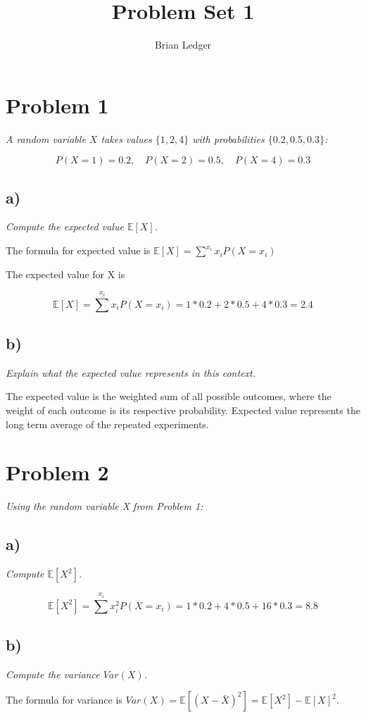 \documentclass[11pt, oneside]{article}   	%
\title{Problem Set 1}
\author{Brian Ledger}
\begin{document}
\maketitle
\section*{Problem 1}
\emph{A random variable $X$ takes values $\{1,2,4\}$ with probabilities $\{0.2,0.5,0.3\}$:}

$$
P(X=1) = 0.2, \quad P(X=2) = 0.5, \quad P(X = 4) = 0.3
$$
\subsection*{a)}
\emph{Compute the expected value $\mathbb{E}[X]$.}

The formula for expected value is $\mathbb{E}[X] = \sum^{x_i} x_iP(X=x_i)$

The expected value for X is

$$
\mathbb{E}[X] = \sum^{x_i} x_iP(X=x_i) = 1*0.2 + 2 * 0.5 + 4 * 0.3 = 2.4
$$

\subsection*{b)}
\emph{Explain what the expected value represents in this context.}

The expected value is the weighted sum of all possible outcomes, where the weight of each outcome is its respective probability. Expected value represents the long term average of the repeated experiments.

\section*{Problem 2}
\emph{Using the random variable X from Problem 1:}

\subsection*{a)}
\emph{Compute $\mathbb{E}[X^2]$.}

$$
\mathbb{E}[X^2] = \sum^{x_i} x_i^2P(X=x_i) = 1*0.2 + 4 * 0.5 + 16 * 0.3 = 8.8
$$

\subsection*{b)}
\emph{Compute the variance $Var(X)$.}

The formula for variance is $Var(X) = \mathbb{E}[(X-\bar{X})^2] = \mathbb{E}[X^2]-\mathbb{E}[X]^2$.
\end{document}
